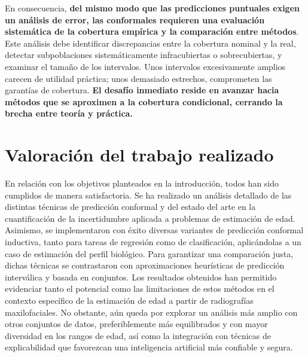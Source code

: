 En consecuencia, \textbf{del mismo modo que las predicciones puntuales exigen un análisis de error, las conformales requieren una evaluación sistemática de la cobertura empírica y la comparación entre métodos}. Este análisis debe identificar discrepancias entre la cobertura nominal y la real, detectar subpoblaciones sistemáticamente infracubiertas o sobrecubiertas, y examinar el tamaño de los intervalos. Unos intervalos excesivamente amplios carecen de utilidad práctica; unos demasiado estrechos, comprometen las garantías de cobertura. \textbf{El desafío inmediato reside en avanzar hacia métodos que se aproximen a la cobertura condicional, cerrando la brecha entre teoría y práctica.}


\section{Valoración del trabajo realizado}


En relación con los objetivos planteados en la introducción, todos han sido cumplidos de manera satisfactoria. Se ha realizado un análisis detallado de las distintas técnicas de predicción conformal y del estado del arte en la cuantificación de la incertidumbre aplicada a problemas de estimación de edad. Asimismo, se implementaron con éxito diversas variantes de predicción conformal inductiva, tanto para tareas de regresión como de clasificación, aplicándolas a un caso de estimación del perfil biológico. Para garantizar una comparación justa, dichas técnicas se contrastaron con aproximaciones heurísticas de predicción interválica y basada en conjuntos. Los resultados obtenidos han permitido evidenciar tanto el potencial como las limitaciones de estos métodos en el contexto específico de la estimación de edad a partir de radiografías maxilofaciales. No obstante, aún queda por explorar un análisis más amplio con otros conjuntos de datos, preferiblemente más equilibrados y con mayor diversidad en los rangos de edad, así como la integración con técnicas de explicabilidad que favorezcan una inteligencia artificial más confiable y segura. 


